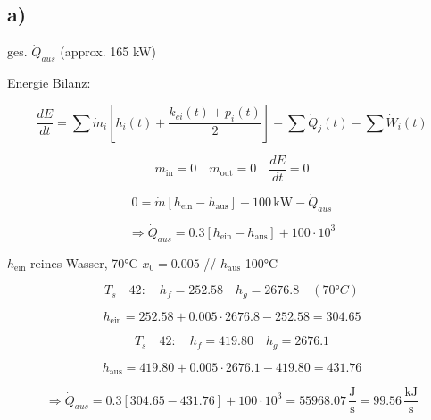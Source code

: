 

\subsection*{a)}

ges. $\dot{Q}_{aus}$ \hfill (approx. 165 kW)

Energie Bilanz:

\[
\frac{dE}{dt} = \sum \dot{m}_i \left[ h_i(t) + \frac{k_{ei}(t) + p_i(t)}{2} \right] + \sum \dot{Q}_j(t) - \sum \dot{W}_i(t)
\]

\[
\dot{m}_{\text{in}} = 0 \quad \dot{m}_{\text{out}} = 0 \quad \frac{dE}{dt} = 0
\]

\[
0 = \dot{m} \left[ h_{\text{ein}} - h_{\text{aus}} \right] + 100 \, \text{kW} - \dot{Q}_{aus}
\]

\[
\Rightarrow \dot{Q}_{aus} = 0.3 \left[ h_{\text{ein}} - h_{\text{aus}} \right] + 100 \cdot 10^3
\]

$h_{\text{ein}}$ reines Wasser, 70°C \quad $x_0 = 0.005$ \quad // $h_{\text{aus}}$ 100°C

\[
T_s \quad 42: \quad h_f = 252.58 \quad h_g = 2676.8 \quad (70°C)
\]

\[
h_{\text{ein}} = 252.58 + 0.005 \cdot 2676.8 - 252.58 = 304.65
\]

\[
T_s \quad 42: \quad h_f = 419.80 \quad h_g = 2676.1
\]

\[
h_{\text{aus}} = 419.80 + 0.005 \cdot 2676.1 - 419.80 = 431.76
\]

\[
\Rightarrow \dot{Q}_{aus} = 0.3 \left[ 304.65 - 431.76 \right] + 100 \cdot 10^3 = 55968.07 \, \frac{\text{J}}{\text{s}} = 99.56 \, \frac{\text{kJ}}{\text{s}}
\]